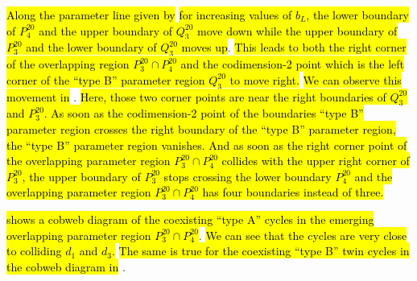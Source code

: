 \hl{Along the parameter line given by}  \hl{for increasing values of $b_L$, the lower boundary of $P^{20}_4$ and the upper boundary of $Q^{20}_3$ move down while the upper boundary of $P^{20}_3$ and the lower boundary of $Q^{20}_3$ moves up}.
\hl{
	This leads to both the right corner of the overlapping region $P^{20}_3 \cap P^{20}_4$ and the codimension-2 point which is the left corner of the ``type B'' parameter region $Q^{20}_3$ to move right.
}
\hl{We can observe this movement in} .
\hl{
	Here, those two corner points are near the right boundaries of $Q^{20}_3$ and $P^{20}_3$.
	As soon as the codimension-2 point of the boundaries ``type B'' parameter region crosses the right boundary of the ``type B'' parameter region, the ``type B'' parameter region vanishes.
	And as soon as the right corner point of the overlapping parameter region $P^{20}_3 \cap P^{20}_4$ collides with the upper right corner of $P^{20}_3$, the upper boundary of $P^{20}_3$ stops crossing the lower boundary $P^{20}_4$ and the overlapping parameter region $P^{20}_3 \cap P^{20}_4$ has four boundaries instead of three.
}

 \hl{shows a cobweb diagram of the coexisting ``type A'' cycles in the emerging overlapping parameter region $P^{20}_3 \cap P^{20}_4$}.
\hl{
	We can see that the cycles are very close to colliding $d_1$ and $d_3$.
}
\hl{The same is true for the coexisting ``type B'' twin cycles in the cobweb diagram in} .
